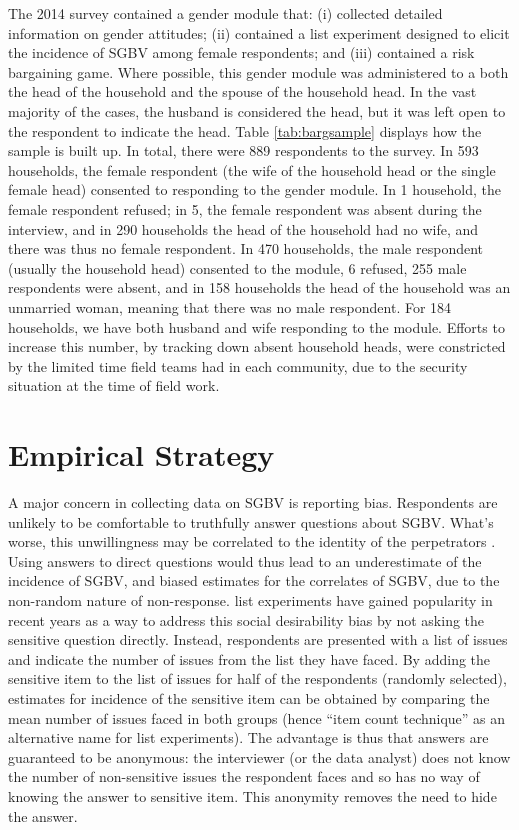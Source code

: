 \documentclass[10pt,a4paper]{scrartcl} %
\begin{document}
The 2014 survey contained a gender module that: (i) collected detailed information on gender attitudes; (ii) contained a list experiment designed to elicit the incidence of SGBV among female respondents; and (iii) contained a risk bargaining game. Where possible, this gender module was administered to a both the head of the household and the spouse of the household head. In the vast majority of the cases, the husband is considered the head, but it was left open to the respondent to indicate the head. Table \ref{tab:bargsample} displays how the sample is built up. In total, there were 889 respondents to the survey. In 593 households, the female respondent (the wife of the household head or the single female head) consented to responding to the gender module. In 1 household, the female respondent refused; in 5, the female respondent was absent during the interview, and in 290 households the head of the household had no wife, and there was thus no female respondent. In 470 households, the male respondent (usually the household head) consented to the module, 6 refused, 255 male respondents were absent, and in 158 households the head of the household was an unmarried woman, meaning that there was no male respondent. For 184 households, we have both husband and wife responding to the module. Efforts to increase this number, by tracking down absent household heads, were constricted by the limited time field teams had in each community, due to the security situation at the time of field work.



\section*{Empirical Strategy}
A major concern in collecting data on SGBV is reporting bias. Respondents are unlikely to be comfortable to truthfully answer questions about SGBV. What's worse, this unwillingness may be correlated to the identity of the perpetrators \citep{Stark2017}. Using answers to direct questions would thus lead to an underestimate of the incidence of SGBV, and biased estimates for the correlates of SGBV, due to the non-random nature of non-response. list experiments have gained popularity in recent years as a way to address this social desirability bias by not asking the sensitive question directly. Instead, respondents are presented with a list of issues and indicate the number of issues from the list they have faced. By adding the sensitive item to the list of issues for half of the respondents (randomly selected), estimates for incidence of the sensitive item can be obtained by comparing the mean number of issues faced in both groups (hence ``item count technique'' as an alternative name for list experiments). The advantage is thus that answers are guaranteed to be anonymous: the interviewer (or the data analyst) does not know the number of non-sensitive issues the respondent faces and so has no way of knowing the answer to sensitive item. This anonymity removes the need to hide the answer. 
\end{document}
